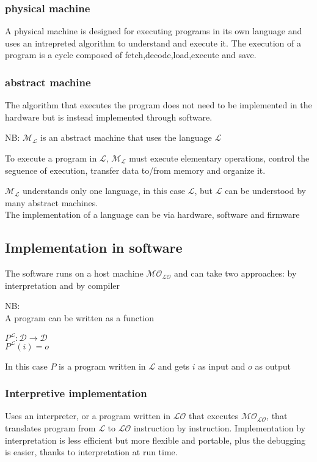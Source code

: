\documentclass[12pt, a4paper]{article}
\begin{document}
\subsubsection{physical machine}
A physical machine is designed for executing programs in its own language and uses an intrepreted algorithm to
understand and execute it. The execution of a program is a cycle composed of fetch,decode,load,execute and save.

\subsubsection{abstract machine}
The algorithm that executes the program does not need to be implemented in the hardware but is instead implemented
through software.

NB: $\mathcal{M_{L}}$ is an abstract machine that uses the language $\mathcal{L}$

To execute a program in $\mathcal{L}$, $\mathcal{M_{L}}$ must execute elementary operations, control the seguence of
execution, transfer data to/from memory and organize it.

\newpage
$\mathcal{M_{L}}$ understands only one language, in this case $\mathcal{L}$, but  $\mathcal{L}$ can be understood
by many abstract machines.\\The implementation of a language can be via hardware, software and firmware

\subsection{Implementation in software}
The software runs on a host machine $\mathcal{MO_{LO}}$ and can take two approaches: by interpretation and by compiler

NB:\\ A program can be written as a function
\begin{center}
    $P^{\mathcal{L}}:\mathcal{D}\rightarrow\mathcal{D}$\\
    $P^{\mathcal{L}}(i)=o$\\
\end{center}
In this case $P$ is a program written in $\mathcal{L}$ and gets $i$ as input and $o$ as output

\subsubsection{Interpretive implementation}
Uses an interpreter, or a program written in $\mathcal{LO}$ that executes $\mathcal{MO_{LO}}$, that translates
program from $\mathcal{L}$ to $\mathcal{LO}$ instruction by instruction. Implementation by interpretation is less
efficient but more flexible and portable, plus the debugging is easier, thanks to interpretation at run time.
\end{document}
